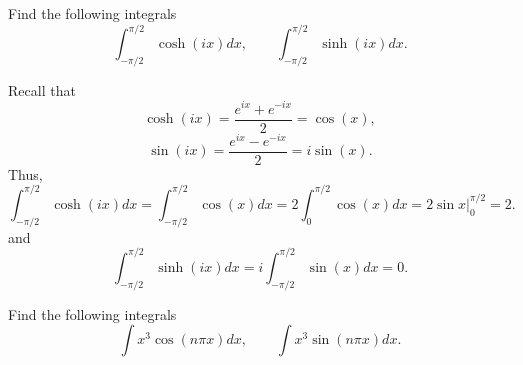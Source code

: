 \documentclass[11pt]{article}
\begin{document}
\begin{problem}
Find the following integrals
\[\int^{\pi/2}_{-\pi/2}\cosh(ix)dx, \qquad \int^{\pi/2}_{-\pi/2}\sinh(ix)dx.\]
\end{problem}
\begin{solution}
Recall that
\[\cosh(ix)=\frac{e^{ix}+e^{-ix}}{2}=\cos(x),\]
\[\sin(ix)=\frac{e^{ix}-e^{-ix}}{2}=i\sin(x).\]
Thus,
\[\int^{\pi/2}_{-\pi/2}\cosh(ix)dx = \int^{\pi/2}_{-\pi/2}\cos(x)dx= 2 \int^{\pi/2}_{0}\cos(x)dx = 2 \left.\sin x \right|_{0}^{\pi/2} = 2.\]
and
\[\int^{\pi/2}_{-\pi/2}\sinh(ix)dx = i \int^{\pi/2}_{-\pi/2}\sin(x)dx = 0.\]
\end{solution}




\begin{problem}
Find the following integrals
\[ \int x^{3}\cos(n\pi x)dx, \qquad \int x^{3}\sin(n\pi x)dx.\]
\end{problem}
\end{document}
